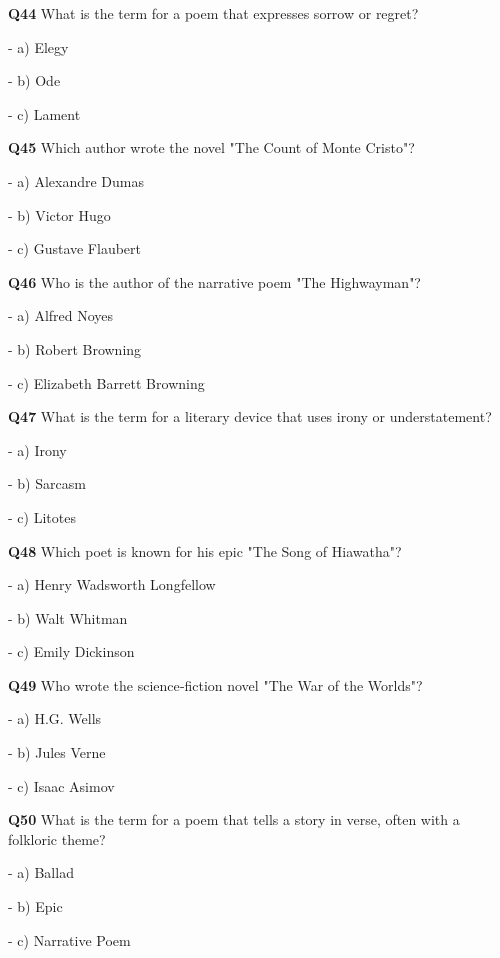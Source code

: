 \textbf{Q44} What is the term for a poem that expresses sorrow or regret?\par
\quad - a) Elegy\par
\quad - b) Ode\par
\quad - c) Lament\par

\textbf{Q45} Which author wrote the novel "The Count of Monte Cristo"?\par
\quad - a) Alexandre Dumas\par
\quad - b) Victor Hugo\par
\quad - c) Gustave Flaubert\par

\textbf{Q46} Who is the author of the narrative poem "The Highwayman"?\par
\quad - a) Alfred Noyes\par
\quad - b) Robert Browning\par
\quad - c) Elizabeth Barrett Browning\par

\textbf{Q47} What is the term for a literary device that uses irony or understatement?\par
\quad - a) Irony\par
\quad - b) Sarcasm\par
\quad - c) Litotes\par

\textbf{Q48} Which poet is known for his epic "The Song of Hiawatha"?\par
\quad - a) Henry Wadsworth Longfellow\par
\quad - b) Walt Whitman\par
\quad - c) Emily Dickinson\par

\textbf{Q49} Who wrote the science‑fiction novel "The War of the Worlds"?\par
\quad - a) H.G. Wells\par
\quad - b) Jules Verne\par
\quad - c) Isaac Asimov\par

\textbf{Q50} What is the term for a poem that tells a story in verse, often with a folkloric theme?\par
\quad - a) Ballad\par
\quad - b) Epic\par
\quad - c) Narrative Poem\par
